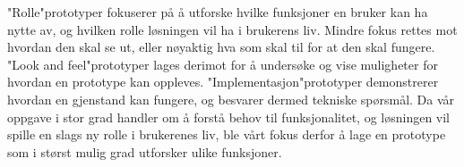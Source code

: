 \noindent
"Rolle"\-prototyper fokuserer på å utforske hvilke funksjoner en bruker kan ha nytte av, og hvilken rolle løsningen vil ha i brukerens liv. Mindre fokus rettes mot hvordan den skal se ut, eller nøyaktig hva som skal til for at den skal fungere. "Look and feel"\-prototyper lages derimot for å undersøke og vise muligheter for hvordan en prototype kan oppleves. "Implementasjon"\-prototyper demonstrerer hvordan en gjenstand kan fungere, og besvarer dermed tekniske spørsmål. Da vår oppgave i stor grad handler om å forstå behov til funksjonalitet, og løsningen vil spille en slags ny rolle i brukerenes liv, ble vårt fokus derfor å lage en prototype som i størst mulig grad utforsker ulike funksjoner.


